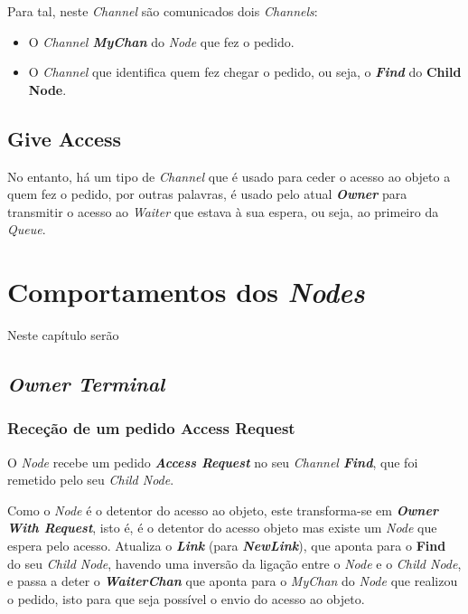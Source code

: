 Para tal, neste \emph{Channel} são comunicados dois \emph{Channels}:
\begin{itemize} \item O \emph{Channel \textbf{MyChan}} do \emph{Node} que fez o pedido.
    \item O \emph{Channel} que identifica quem fez chegar o pedido, ou seja, o \emph{\textbf{Find}} do \textbf{Child Node}.
\end{itemize}


\subsection*{Give Access}
No entanto, há um tipo de \emph{Channel} que é usado para ceder o acesso ao objeto a quem fez o pedido, por outras palavras, é usado pelo atual \emph{\textbf{Owner}} para transmitir o acesso ao \emph{Waiter} que estava à sua espera, ou seja, ao primeiro da \emph{Queue}.



\section{Comportamentos dos \emph{Nodes}}

Neste capítulo serão 

\subsection*{\emph{Owner Terminal}}
\label{especificacao:nodes:owner_terminal}


\subsubsection*{Receção de um pedido Access Request}
O \emph{Node} recebe um pedido \emph{\textbf{Access Request}} no seu \emph{Channel \textbf{Find}},
que foi remetido pelo seu \emph{Child Node}. 


Como o \emph{Node} é o detentor do acesso ao objeto, este transforma-se em \emph{\textbf{Owner With Request}},
isto é, é o detentor do acesso objeto mas existe um \emph{Node} que espera pelo acesso.
Atualiza o \textbf{\emph{Link}} (para \textbf{\emph{NewLink}}),
que aponta para o \textbf{Find} do seu \emph{Child Node}, havendo uma inversão da ligação entre o \emph{Node} e o \emph{Child Node},
e passa a deter o \textbf{\emph{WaiterChan}} que aponta para o \emph{MyChan} do \emph{Node} que realizou o pedido, isto para
que seja possível o envio do acesso ao objeto.


